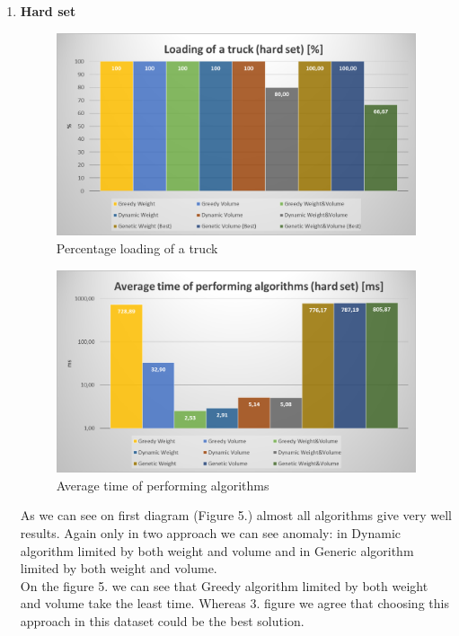 \documentclass[conference,compsoc]{IEEEtran}
\begin{document}
\begin{enumerate}
\newpage
\item \textbf{Hard set}

\begin{figure}[H]
  \centering
  \includegraphics[width=\columnwidth]{image023.png}
  \caption{Percentage loading of a truck }
\end{figure}

\begin{figure}[H]
  \centering
  \includegraphics[width=\columnwidth]{image029.png}
  \caption{Average time of performing algorithms}
\end{figure}

As we can see on first diagram (Figure 5.) almost all algorithms give very well results. Again only in two approach we can see anomaly: in Dynamic algorithm limited by both weight and volume and in Generic algorithm limited by both weight and volume.\\

On the figure 5. we can see that Greedy algorithm limited by both weight and volume take the least time. Whereas 3. figure we agree that choosing this approach in this dataset could be the best solution.\\


\end{enumerate}
\end{document}
